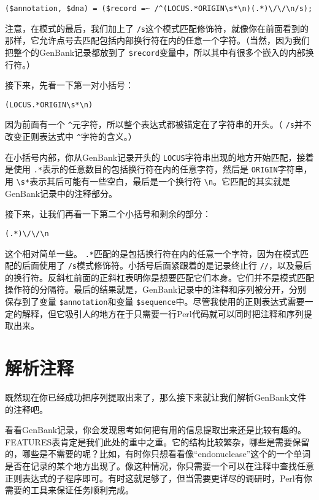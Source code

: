 \begin{lstlisting}
($annotation, $dna) = ($record =~ /^(LOCUS.*ORIGIN\s*\n)(.*)\/\/\n/s);
\end{lstlisting}

注意，在模式的最后，我们加上了 \verb|/s|这个模式匹配修饰符，就像你在前面看到的那样，它允许点号去匹配包括内部换行符在内的任意一个字符。（当然，因为我们把整个的GenBank记录都放到了 \verb|$record|变量中，所以其中有很多个嵌入的内部换行符。）

接下来，先看一下第一对小括号：

\begin{lstlisting}
(LOCUS.*ORIGIN\s*\n)
\end{lstlisting}

因为前面有一个 \verb|^|元字符，所以整个表达式都被锚定在了字符串的开头。（ \verb|/s|并不改变正则表达式中 \verb|^|字符的含义。） 

在小括号内部，你从GenBank记录开头的 \verb|LOCUS|字符串出现的地方开始匹配，接着是使用 \verb|.*|表示的任意数目的包括换行符在内的任意字符，然后是 \verb|ORIGIN|字符串，用 \verb|\s*|表示其后可能有一些空白，最后是一个换行符 \verb|\n|。它匹配的其实就是GenBank记录中的注释部分。

接下来，让我们再看一下第二个小括号和剩余的部分：

\begin{lstlisting}
(.*)\/\/\n
\end{lstlisting}

这个相对简单一些。 \verb|.*|匹配的是包括换行符在内的任意一个字符，因为在模式匹配的后面使用了 \verb|/s|模式修饰符。小括号后面紧跟着的是记录终止行 \verb|//|，以及最后的换行符。反斜杠前面的正斜杠表明你是想要匹配它们本身。它们并不是模式匹配操作符的分隔符。最后的结果就是，GenBank记录中的注释和序列被分开，分别保存到了变量 \verb|$annotation|和变量 \verb|$sequence|中。尽管我使用的正则表达式需要一定的解释，但它吸引人的地方在于只需要一行Perl代码就可以同时把注释和序列提取出来。

\section{解析注释}
既然现在你已经成功把序列提取出来了，那么接下来就让我们解析GenBank文件的注释吧。

看看GenBank记录，你会发现思考如何把有用的信息提取出来还是比较有趣的。FEATURES表肯定是我们此处的重中之重。它的结构比较繁杂，哪些是需要保留的，哪些是不需要的呢？比如，有时你只想看看像“endonuclease”这个的一个单词是否在记录的某个地方出现了。像这种情况，你只需要一个可以在注释中查找任意正则表达式的子程序即可。有时这就足够了，但当需要更详尽的调研时，Perl有你需要的工具来保证任务顺利完成。

